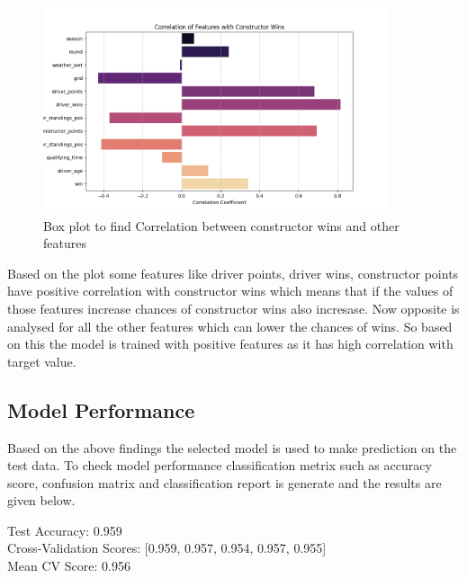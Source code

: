 \documentclass[11pt,article,oneside]{article}
\begin{document}
\begin{figure}[htbp]
    \centering
    \includegraphics[width=0.9\textwidth]{code/Images/constructor_wins_correlation_plot.png}
    \caption{Box plot to find Correlation between constructor wins and other features}
\end{figure}
 
Based on the plot some features like driver points, driver wins, constructor points have positive correlation with constructor wins which means that if the values of those features increase chances of constructor wins also incresase.
Now opposite is analysed for all the other features which can lower the chances of wins. So based on this the model is trained with positive features as it has high correlation with target value. 

\subsection{Model Performance}
Based on the above findings the selected model is used to make prediction on the test data. To check model performance classification metrix such as accuracy score, confusion matrix and classification report is generate and the results are given below. 

Test Accuracy: 0.959 \\
Cross-Validation Scores: [0.959, 0.957, 0.954, 0.957, 0.955] \\
Mean CV Score: 0.956 \\
\end{document}
